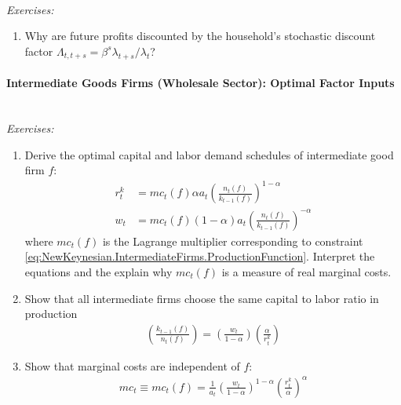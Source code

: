 ~\\\noindent\emph{Exercises:}
\begin{enumerate}[resume]
\item Why are future profits discounted by the household's stochastic discount factor $\Lambda_{t,t+s} = \beta^s \lambda_{t+s}/\lambda_{t}$?
\end{enumerate}

\paragraph{Intermediate Goods Firms (Wholesale Sector): Optimal Factor Inputs}

~\\\noindent\emph{Exercises:}
\begin{enumerate}[resume]

\item Derive the optimal capital and labor demand schedules of intermediate good firm $f$:
\begin{align}
r^k_t  &= mc_t(f) \alpha a_t \left( \frac{n_t(f)}{k_{t-1}(f)}\right)^{1-\alpha}
\label{eq:NewKeynesian.IntermediateFirms.CapitalDemand}
\\
w_t  &= mc_t(f) (1-\alpha) a_t \left(\frac{n_t(f)}{k_{t-1}(f)}\right)^{-\alpha}
\label{eq:NewKeynesian.IntermediateFirms.LaborDemand}
\end{align}
where $mc_t(f)$ is the Lagrange multiplier corresponding to constraint \eqref{eq:NewKeynesian.IntermediateFirms.ProductionFunction}.
Interpret the equations and the explain why $mc_t(f)$ is a measure of real marginal costs.

\item Show that all intermediate firms choose the same capital to labor ratio in production
\begin{align}
\left(\frac{k_{t-1}(f)}{n_t(f)}\right) = \left(\frac{w_t}{1-\alpha}\right) \left(\frac{\alpha}{r^k_t}\right) \label{eq:NewKeynesian.IntermediateFirms.CapitalLaborRatio}
\end{align}

\item Show that marginal costs are independent of $f$:
\begin{align}
mc_t \equiv mc_t(f) = \frac{1}{a_t} \left(\frac{w_t}{1-\alpha}\right)^{1-\alpha} \left(\frac{r^k_t}{\alpha}\right)^{\alpha} \label{eq:NewKeynesian.RealMarginalCosts}
\end{align}

\end{enumerate}

